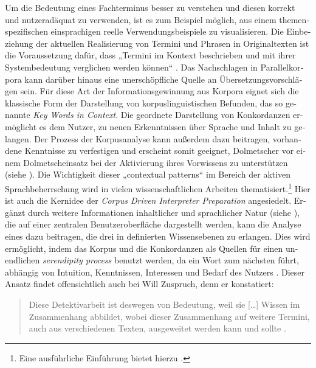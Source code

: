 \documentclass[output=paper]{LSP/langsci}
\begin{document}
\begin{otherlanguage}{ngerman}
Um die Bedeutung eines Fachterminus besser zu verstehen und diesen korrekt und nutzeradäquat zu verwenden, ist es zum Beispiel möglich, aus einem themenspezifischen einsprachigen  reelle Verwendungsbeispiele zu visualisieren. Die Einbeziehung der aktuellen Realisierung von Termini und Phrasen in Originaltexten ist die Voraussetzung dafür, dass „Termini im Kontext beschrieben und mit ihrer Systembedeutung verglichen werden können“ \citep[42]{Will2009}. Das Nachschlagen in Parallelkorpora kann darüber hinaus eine unerschöpfliche Quelle an Übersetzungsvorschlägen sein. Für diese Art der Informationsgewinnung aus Korpora eignet sich die klassische Form der Darstellung von korpuslinguistischen Befunden, das so genannte \textit{Key Words in Context}. Die geordnete Darstellung von Konkordanzen ermöglicht es dem Nutzer, zu neuen Erkenntnissen über Sprache und Inhalt zu gelangen. Der Prozess der Korpusanalyse kann außerdem dazu beitragen, vorhandene Kenntnisse zu verfestigen \citep{Johns1991} und erscheint somit geeignet, Dolmetscher vor einem Dolmetscheinsatz bei der Aktivierung ihres Vorwissens zu unterstützen (siehe ). Die Wichtigkeit dieser „contextual patterns“ \citep[15]{Aston2001} im Bereich der aktiven Sprachbeherrschung wird in vielen wissenschaftlichen Arbeiten thematisiert.\footnote{Eine ausführliche Einführung bietet hierzu \citet{Aston2001}.} Hier ist auch die Kernidee der \textit{Corpus Driven Interpreter Preparation} \citep{Fantinuoli2006} angesiedelt. Ergänzt durch weitere Informationen inhaltlicher und sprachlicher Natur (siehe ), die auf einer zentralen Benutzeroberfläche dargestellt werden, kann die Analyse eines  dazu beitragen, die drei in  definierten Wissensebenen zu erlangen. Dies wird ermöglicht, indem das Korpus und die Konkordanzen als Quellen für einen unendlichen \textit{serendipity process} \citep{Johns1988} benutzt werden, da ein Wort zum nächsten führt, abhängig von Intuition, Kenntnissen, Interessen und Bedarf des Nutzers \citep{Bernardini2001}. Dieser Ansatz findet offensichtlich auch bei Will Zuspruch, denn er konstatiert:

\begin{quote}
Diese Detektivarbeit ist deswegen von Bedeutung, weil sie [\ldots] Wissen im Zusammenhang abbildet, wobei dieser Zusammenhang auf weitere Termini, auch aus verschiedenen Texten, ausgeweitet werden kann und sollte \citep[53]{Will2010}.
\end{quote}


\end{otherlanguage}
\end{document}
